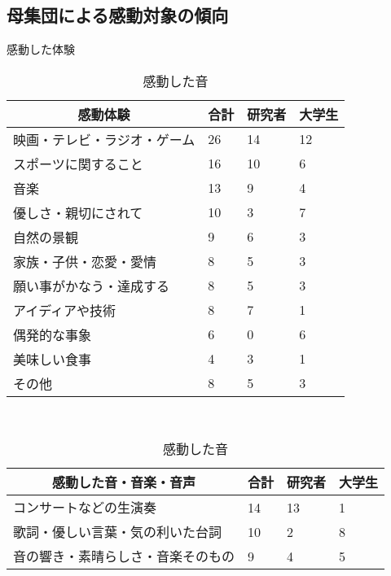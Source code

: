 \documentclass[japanese]{jnlp_1.3c}
\begin{document}
\subsection{母集団による感動対象の傾向}

\begin{table}[b]
\begin{center}
\caption{感動した体験}
\begin{tabular*}{125mm}{|p{75mm}|p{12mm}|p{12mm}|p{12mm}|}       \hline
\multicolumn{1}{|c|}{感動体験} & 合計 & 研究者 & 大学生 \\       \hline
映画・テレビ・ラジオ・ゲーム   & 26   & 14     & 12     \\       \hline
スポーツに関すること           & 16   & 10     & 6      \\       \hline
音楽                           & 13   & 9      & 4      \\       \hline
優しさ・親切にされて           & 10   & 3      & 7      \\       \hline
自然の景観                     &  9   & 6      & 3      \\       \hline
家族・子供・恋愛・愛情         &  8   & 5      & 3      \\       \hline
願い事がかなう・達成する       &  8   & 5      & 3      \\       \hline
アイディアや技術               &  8   & 7      & 1      \\       \hline
偶発的な事象                   &  6   & 0      & 6      \\       \hline
美味しい食事                   &  4   & 3      & 1      \\       \hline
その他                         &  8   & 5      & 3      \\       \hline
\end{tabular*}                                          \\
\par
\vspace{1\baselineskip}
\caption{感動した音}
\begin{tabular*}{125mm}{|p{75mm}|p{12mm}|p{12mm}|p{12mm}|}     \hline
\multicolumn{1}{|c|}{感動した音・音楽・音声} &合計&研究者&大学生 \\ \hline
コンサートなどの生演奏             & 14   & 13     & 1      \\ \hline
歌詞・優しい言葉・気の利いた台詞   & 10   &  2     & 8      \\ \hline
音の響き・素晴らしさ・音楽そのもの &  9   &  4     & 5      \\ \hline

\end{tabular*}
\end{center}
\end{table}
\end{document}
